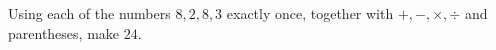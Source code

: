 Using each of the numbers $8,2,8,3$ exactly once, together with $+,-,\times,\div$ and parentheses, make $24$.
